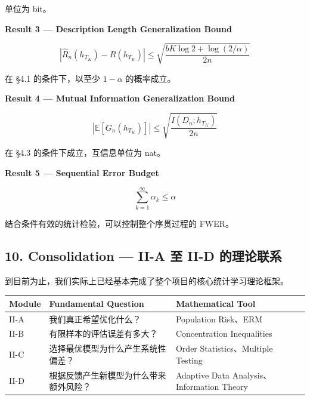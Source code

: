 单位为 bit。

\textbf{Result 3 --- Description Length Generalization Bound}

\[\boxed{
|\widehat R_n(h_{T_K})-R(h_{T_K})|
\leq
\sqrt{
\frac{bK\log 2+\log(2/\alpha)}{2n}
}
}\]

在 §4.1 的条件下，以至少 \(1-\alpha\) 的概率成立。

\textbf{Result 4 --- Mutual Information Generalization Bound}

\[\boxed{
\left|
\mathbb E[G_n(h_{T_K})]
\right|
\leq
\sqrt{
\frac{I(D_n;h_{T_K})}{2n}
}
}\]

在 §4.3 的条件下成立，互信息单位为 nat。

\textbf{Result 5 --- Sequential Error Budget}

\[\boxed{
\sum_{k=1}^{\infty}\alpha_k\leq\alpha
}\]

结合条件有效的统计检验，可以控制整个序贯过程的 FWER。

\hypertarget{part-2-20-0001-consolidation-ii-a-ux81f3-ii-d-ux7684ux7406ux8bbaux8054ux7cfb}{%
\subsection{10. Consolidation --- II-A 至 II-D 的理论联系}\label{part-2-20-0001-consolidation-ii-a-ux81f3-ii-d-ux7684ux7406ux8bbaux8054ux7cfb}}

到目前为止，我们实际上已经基本完成了整个项目的核心统计学习理论框架。

\begin{readertable}
\begin{longtable}[]{@{}
  >{\raggedright\arraybackslash}p{}
  >{\raggedright\arraybackslash}p{}
  >{\raggedright\arraybackslash}p{}@{}}
\toprule
Module & Fundamental Question & Mathematical Tool \\
\midrule
\endhead
II-A & 我们真正希望优化什么？ & Population Risk、ERM \\
II-B & 有限样本的评估误差有多大？ & Concentration Inequalities \\
II-C & 选择最优模型为什么产生系统性偏差？ & Order Statistics、Multiple Testing \\
II-D & 根据反馈产生新模型为什么带来额外风险？ & Adaptive Data Analysis、Information Theory \\
\bottomrule
\end{longtable}
\end{readertable}

